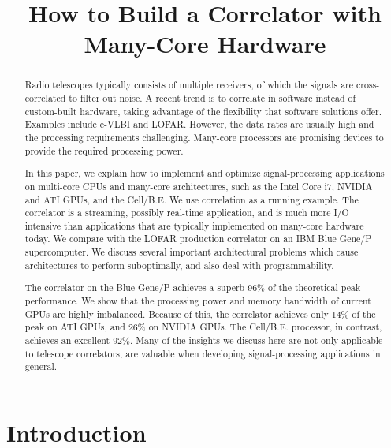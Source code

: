\documentclass{article}
\title{How to Build a Correlator with Many-Core Hardware}
\begin{document}
\maketitle

\begin{abstract}
Radio telescopes typically consists of multiple receivers, of which
the signals are cross-correlated to filter out noise.  A recent trend
is to correlate in software instead of custom-built hardware, taking
advantage of the flexibility that software solutions offer.  Examples
include e-VLBI and LOFAR.  However, the data rates are usually high
and the processing requirements challenging.  Many-core processors are
promising devices to provide the required processing power.

In this paper, we explain how to implement and optimize
signal-processing applications on multi-core CPUs and many-core
architectures, such as the Intel Core i7, NVIDIA and ATI GPUs, and the
\mbox{Cell/B.E.}  We use correlation as a running example. The
correlator is a streaming, possibly real-time application, and is much
more I/O intensive than applications that are typically implemented on
many-core hardware today.  We compare with the LOFAR production
correlator on an IBM Blue Gene/P supercomputer.  We discuss several
important architectural problems which cause architectures to perform
suboptimally, and also deal with programmability.

The correlator on the Blue Gene/P achieves a superb 96\% of the
theoretical peak performance.  We show that the processing power and
memory bandwidth of current GPUs are highly imbalanced. Because of
this, the correlator achieves only 14\% of the peak on ATI GPUs, and
26\% on NVIDIA GPUs.  The \mbox{Cell/B.E.} processor, in contrast,
achieves an excellent 92\%.  Many of the insights we discuss here are not only
applicable to telescope correlators, are valuable when developing
signal-processing applications in general.
\end{abstract}


\section{Introduction}

\end{document}
